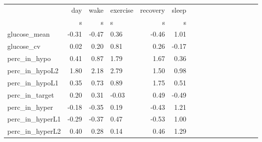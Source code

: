 \begin{tabular}{lrrlrrlrrlrrlrrl}
\toprule
{} &   day &  wake & exercise & recovery & sleep \\
{} &     s &     s &        s &        s &     s \\
\midrule
glucose_mean    & -0.31 & -0.47 &     0.36 &    -0.46 &  1.01 \\
glucose_cv      &  0.02 &  0.20 &     0.81 &     0.26 & -0.17 \\
perc_in_hypo    &  0.41 &  0.87 &     1.79 &     1.67 &  0.36 \\
perc_in_hypoL2  &  1.80 &  2.18 &     2.79 &     1.50 &  0.98 \\
perc_in_hypoL1  &  0.35 &  0.73 &     0.89 &     1.75 &  0.51 \\
perc_in_target  &  0.20 &  0.31 &    -0.03 &     0.49 & -0.49 \\
perc_in_hyper   & -0.18 & -0.35 &     0.19 &    -0.43 &  1.21 \\
perc_in_hyperL1 & -0.29 & -0.37 &     0.47 &    -0.53 &  1.00 \\
perc_in_hyperL2 &  0.40 &  0.28 &     0.14 &     0.46 &  1.29 \\
\bottomrule
\end{tabular}
